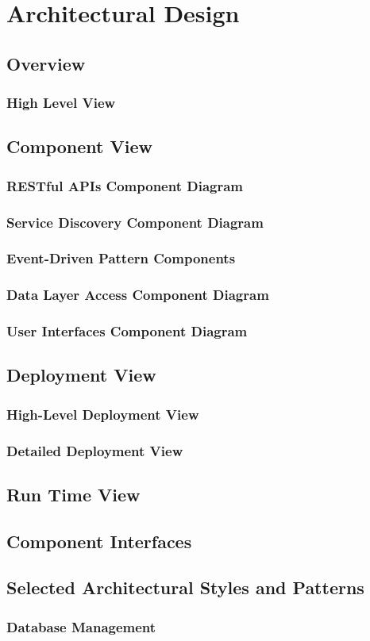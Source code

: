 \chapter{Architectural Design}

\section{Overview}
\subsection{High Level View}

\section{Component View}
\subsection{RESTful APIs Component Diagram}
\subsection{Service Discovery Component Diagram}
\subsection{Event-Driven Pattern Components}
\subsection{Data Layer Access Component Diagram}
\subsection{User Interfaces Component Diagram}

\section{Deployment View}
\subsection{High-Level Deployment View}
\subsection{Detailed Deployment View}

\section{Run Time View}

\section{Component Interfaces}

\section{Selected Architectural Styles and Patterns}
\subsection{Database Management}
